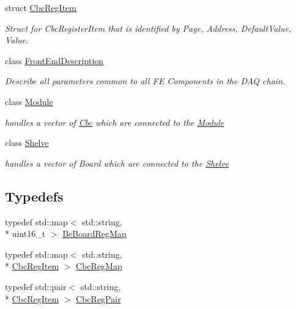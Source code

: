 \begin{DoxyCompactItemize}
struct \hyperlink{struct_ph2___hw_description_1_1_cbc_reg_item}{Cbc\-Reg\-Item}
\begin{DoxyCompactList}\small\item\em Struct for Cbc\-Register\-Item that is identified by Page, Address, Default\-Value, Value. \end{DoxyCompactList}\item 
class \hyperlink{class_ph2___hw_description_1_1_front_end_description}{Front\-End\-Description}
\begin{DoxyCompactList}\small\item\em Describe all parameters common to all F\-E Components in the D\-A\-Q chain. \end{DoxyCompactList}\item 
class \hyperlink{class_ph2___hw_description_1_1_module}{Module}
\begin{DoxyCompactList}\small\item\em handles a vector of \hyperlink{class_ph2___hw_description_1_1_cbc}{Cbc} which are connected to the \hyperlink{class_ph2___hw_description_1_1_module}{Module} \end{DoxyCompactList}\item 
class \hyperlink{class_ph2___hw_description_1_1_shelve}{Shelve}
\begin{DoxyCompactList}\small\item\em handles a vector of Board which are connected to the \hyperlink{class_ph2___hw_description_1_1_shelve}{Shelve} \end{DoxyCompactList}\end{DoxyCompactItemize}
\subsection*{Typedefs}
\begin{DoxyCompactItemize}
\item 
typedef std\-::map$<$ std\-::string, \\*
uint16\-\_\-t $>$ \hyperlink{namespace_ph2___hw_description_a2e13fb82c8ed98154c60f9d0f8467d72}{Be\-Board\-Reg\-Map}
\item 
typedef std\-::map$<$ std\-::string, \\*
\hyperlink{struct_ph2___hw_description_1_1_cbc_reg_item}{Cbc\-Reg\-Item} $>$ \hyperlink{namespace_ph2___hw_description_a9a23b373068f169aa67ca1d22c9a6001}{Cbc\-Reg\-Map}
\item 
typedef std\-::pair$<$ std\-::string, \\*
\hyperlink{struct_ph2___hw_description_1_1_cbc_reg_item}{Cbc\-Reg\-Item} $>$ \hyperlink{namespace_ph2___hw_description_a78856413327152e693dceca249188d11}{Cbc\-Reg\-Pair}
\end{DoxyCompactItemize}


